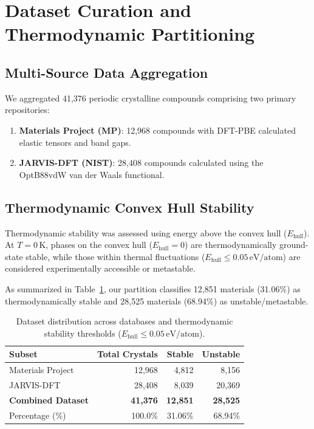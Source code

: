 \documentclass[twocolumn,10pt,aps,prb,superscriptaddress,floatfix]{revtex4-2}
\begin{document}
\section{Dataset Curation and Thermodynamic Partitioning}
\label{sec:dataset}

\subsection{Multi-Source Data Aggregation}
We aggregated 41,376 periodic crystalline compounds comprising two primary repositories:
\begin{enumerate}
    \item \textbf{Materials Project (MP)}: 12,968 compounds with DFT-PBE calculated elastic tensors and band gaps.
    \item \textbf{JARVIS-DFT (NIST)}: 28,408 compounds calculated using the OptB88vdW van der Waals functional.
\end{enumerate}

\subsection{Thermodynamic Convex Hull Stability}
Thermodynamic stability was assessed using energy above the convex hull ($E_{\mathrm{hull}}$). At $T = 0\,\mathrm{K}$, phases on the convex hull ($E_{\mathrm{hull}} = 0$) are thermodynamically ground-state stable, while those within thermal fluctuations ($E_{\mathrm{hull}} \le 0.05\,\mathrm{eV/atom}$) are considered experimentally accessible or metastable.

As summarized in Table~\ref{tab:dataset_stats}, our partition classifies 12,851 materials (31.06\%) as thermodynamically stable and 28,525 materials (68.94\%) as unstable/metastable.

\begin{table}[h]
\centering
\caption{Dataset distribution across databases and thermodynamic stability thresholds ($E_{\mathrm{hull}} \le 0.05\,\mathrm{eV/atom}$).}
\label{tab:dataset_stats}
\begin{ruledtabular}
\begin{tabular}{lrrr}
Subset & Total Crystals & Stable & Unstable \\
\hline
Materials Project & 12,968 & 4,812 & 8,156 \\
JARVIS-DFT & 28,408 & 8,039 & 20,369 \\
\textbf{Combined Dataset} & \textbf{41,376} & \textbf{12,851} & \textbf{28,525} \\
Percentage (\%) & 100.0\% & 31.06\% & 68.94\% \\
\end{tabular}
\end{ruledtabular}
\end{table}
\end{document}
